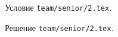 \problem{}
Условие \texttt{team/senior/2.tex}.

\solution Решение \texttt{team/senior/2.tex}.
\endproblem
